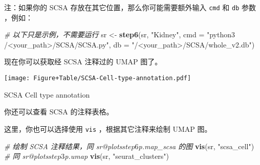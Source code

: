 \documentclass[
]{article}
\newenvironment{Shaded}{\begin{snugshade}}{\end{snugshade}}
\newcommand{\CommentTok}[1]{\textcolor[rgb]{0.56,0.35,0.01}{\textit{#1}}}
\newcommand{\DataTypeTok}[1]{\textcolor[rgb]{0.13,0.29,0.53}{#1}}
\newcommand{\KeywordTok}[1]{\textcolor[rgb]{0.13,0.29,0.53}{\textbf{#1}}}
\newcommand{\NormalTok}[1]{#1}
\newcommand{\OperatorTok}[1]{\textcolor[rgb]{0.81,0.36,0.00}{\textbf{#1}}}
\newcommand{\StringTok}[1]{\textcolor[rgb]{0.31,0.60,0.02}{#1}}
\begin{document}
注：如果你的 SCSA 存放在其它位置，那么你可能需要额外输入 \texttt{cmd} 和 \texttt{db} 参数 ，例如：

\begin{Shaded}
\begin{Highlighting}[]
\CommentTok{\# 以下只是示例，不需要运行}
\NormalTok{sr \textless{}{-}}\StringTok{ }\KeywordTok{step6}\NormalTok{(sr, }\StringTok{"Kidney"}\NormalTok{, }\DataTypeTok{cmd =} \StringTok{"python3 /\textless{}your\_path\textgreater{}/SCSA/SCSA.py"}\NormalTok{, }\DataTypeTok{db =} \StringTok{"/\textless{}your\_path\textgreater{}/SCSA/whole\_v2.db"}\NormalTok{)}
\end{Highlighting}
\end{Shaded}

现在你可以获取经 SCSA 注释过的 UMAP 图了。

\begin{Shaded}
\end{Shaded}

\def\@captype{figure}
\begin{center}
\texttt{[image: Figure+Table/SCSA-Cell-type-annotation.pdf]}
\caption{SCSA Cell type annotation}\label{fig:SCSA-Cell-type-annotation}
\end{center}

你还可以查看 SCSA 的注释表格。

\begin{Shaded}
\end{Shaded}

这里，你也可以选择使用 \texttt{vis} ，根据其它注释来绘制 UMAP 图。

\begin{Shaded}
\begin{Highlighting}[]
\CommentTok{\# 绘制 SCSA 注释结果，同 \textasciigrave{}sr@plots$step6$p.map\_scsa\textasciigrave{} 的图}
\KeywordTok{vis}\NormalTok{(sr, }\StringTok{"scsa\_cell"}\NormalTok{)}
\CommentTok{\# 同 \textasciigrave{}sr@plots$step3$p.umap\textasciigrave{}}
\KeywordTok{vis}\NormalTok{(sr, }\StringTok{"seurat\_clusters"}\NormalTok{)}
\end{Highlighting}
\end{Shaded}
\end{document}
